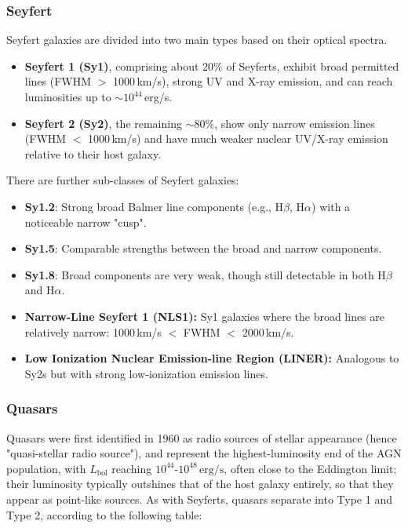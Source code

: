\subsubsection{Seyfert}

Seyfert galaxies are divided into two main types based on their optical spectra.

\begin{itemize}
    \item \textbf{Seyfert 1 (Sy1)}, comprising about 20\% of Seyferts, exhibit broad permitted lines (FWHM $>$ 1000\,km/s), strong UV and X-ray emission, and can reach luminosities up to $\sim 10^{44}$\,erg/s.
    \item \textbf{Seyfert 2 (Sy2)}, the remaining $\sim$80\%, show only narrow emission lines (FWHM $<$ 1000\,km/s) and have much weaker nuclear UV/X-ray emission relative to their host galaxy.
\end{itemize}

There are further sub-classes of Seyfert galaxies:
\begin{itemize}
    \item \textbf{Sy1.2}: Strong broad Balmer line components (e.g., H$\beta$, H$\alpha$) with a noticeable narrow "cusp".
    \item \textbf{Sy1.5}: Comparable strengths between the broad and narrow components.
    \item \textbf{Sy1.8}: Broad components are very weak, though still detectable in both H$\beta$ and H$\alpha$.
    \item \textbf{Narrow-Line Seyfert 1 (NLS1):} Sy1 galaxies where the broad lines are relatively narrow: 1000\,km/s $<$ FWHM $<$ 2000\,km/s.
    \item \textbf{Low Ionization Nuclear Emission-line Region (LINER):} Analogous to Sy2s but with strong low-ionization emission lines.
\end{itemize}


\subsubsection{Quasars}

Quasars were first identified in 1960 as radio sources of stellar appearance (hence "quasi-stellar radio source"), and represent the highest-luminosity end of the AGN population, with $L_{\text{bol}}$ reaching $10^{44}$-$10^{48}\,\text{erg/s}$, often close to the Eddington limit; their luminosity typically outshines that of the host galaxy entirely, so that they appear as point-like sources. As with Seyferts, quasars separate into Type 1 and Type 2, according to the following table:

